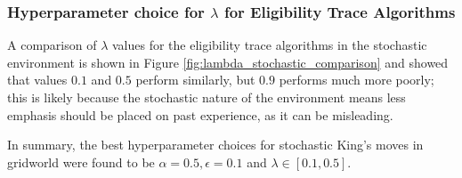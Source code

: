 \documentclass{article}
\begin{document}
\subsubsection{Hyperparameter choice for $\lambda$ for Eligibility Trace Algorithms}

A comparison of $\lambda$ values for the eligibility trace algorithms in the stochastic environment is shown in Figure \ref{fig:lambda_stochastic_comparison} and showed that values $0.1$ and $0.5$ perform similarly, but $0.9$ performs much more poorly; this is likely because the stochastic nature of the environment means less emphasis should be placed on past experience, as it can be misleading. 

In summary, the best hyperparameter choices for stochastic King's moves in gridworld were found to be $\alpha = 0.5, \epsilon = 0.1$ and $\lambda \in [0.1,0.5]$.
\end{document}
